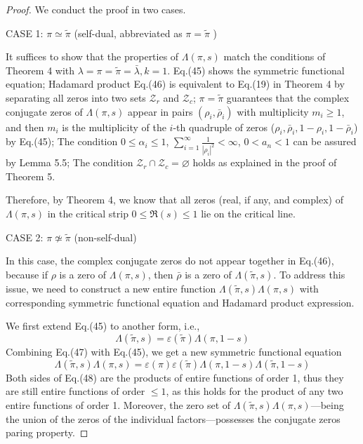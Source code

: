 \documentclass[12pt]{article}
\begin{document}
\begin{proof} We conduct the proof in two cases.

CASE 1: $\pi \simeq \tilde{\pi}$ (self-dual, abbreviated as $\pi = \tilde{\pi}$ )

It suffices to show that the properties of $\Lambda(\pi, s)$ match the conditions of Theorem 4 with $\lambda=\pi= \tilde{\pi}=\bar\lambda, k=1$. Eq.(45) shows the symmetric functional equation; Hadamard product Eq.(46) is equivalent to Eq.(19) in Theorem 4 by separating all zeros into two sets $\mathcal{Z}_{r}$ and  $\mathcal{Z}_{c}$;
  $\pi=\tilde{\pi}$ guarantees that the complex conjugate zeros of $\Lambda(\pi, s)$ appear in pairs $(\rho_i, \bar\rho_i)$ with multiplicity $m_i \ge 1$, and then $m_i$ is the multiplicity of the $i$-th quadruple of zeros ($\rho_i, \bar\rho_i, 1-\rho_i, 1-\bar\rho_i$) by Eq.(45); The condition $0 \leq \alpha_i \leq 1$, $\sum_{i=1}^{\infty}\frac{1}{|\rho_i|^2}<\infty$, $0 < a_n < 1$ can be assured by Lemma 5.5; The condition
 $\mathcal{Z}_{r} \cap \mathcal{Z}_{c} = \varnothing$ holds as explained in the proof of Theorem 5.

 Therefore, by Theorem 4, we know that all zeros (real, if any, and complex) of $\Lambda(\pi, s)$ in the critical strip $0 \leq \Re(s) \leq 1$ lie on the critical line.


CASE 2: $\pi \not\simeq \tilde{\pi}$ (non-self-dual)

In this case, the complex conjugate zeros do not appear together in Eq.(46), because if $\rho$ is a zero of $\Lambda(\pi, s)$, then $\bar{\rho}$ is a zero of $\Lambda(\tilde{\pi}, s)$. To address this issue, we need to construct a new entire function $\Lambda(\tilde{\pi}, s) \Lambda(\pi, s)$ with corresponding symmetric functional equation and Hadamard product expression.

We first extend Eq.(45) to another form, i.e.,
 \begin{equation} \Lambda(\tilde{\pi}, s) = \varepsilon(\tilde{\pi}) \Lambda(\pi, 1-s) \end{equation}
 Combining Eq.(47) with Eq.(45), we get a new symmetric functional equation
 \begin{equation} \Lambda(\tilde{\pi}, s) \Lambda(\pi, s)= \varepsilon(\pi)\varepsilon(\tilde{\pi}) \Lambda(\pi, 1-s)\Lambda(\tilde{\pi}, 1-s) \end{equation}
 Both sides of Eq.(48) are the products of entire functions of order 1, thus they are still entire functions of order $\leq 1$, as this holds for the product of any two entire functions of order 1.
 Moreover, the zero set of $\Lambda(\tilde{\pi}, s) \Lambda(\pi, s)$—being the union of the zeros of the individual factors—possesses the conjugate zeros paring property.


\end{proof}
\end{document}
